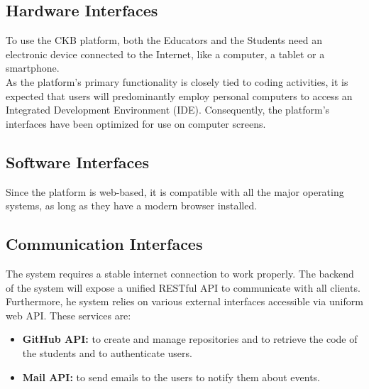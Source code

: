 


\subsection{Hardware Interfaces}
To use the CKB platform, both the Educators and the Students need an electronic device connected to the Internet, like a computer, a tablet or a smartphone.\\
As the platform's primary functionality is closely tied to coding activities, it is expected that users will predominantly employ personal computers to access an Integrated Development Environment (IDE). Consequently, the platform's interfaces have been optimized for use on computer screens.

\subsection{Software Interfaces}
Since the platform is web-based, it is compatible with all the major operating systems, as long as they have a modern browser installed.

\subsection{Communication Interfaces}
The system requires a stable internet connection to work properly. The backend of the system will expose a unified RESTful API to communicate with all clients.\\
Furthermore, he system relies on various external interfaces accessible via uniform web API. These services are:
\begin{itemize}
    \item \textbf{GitHub API:} to create and manage repositories and to retrieve the code of the students and to authenticate users.
    \item \textbf{Mail API:} to send emails to the users to notify them about events.
\end{itemize}

